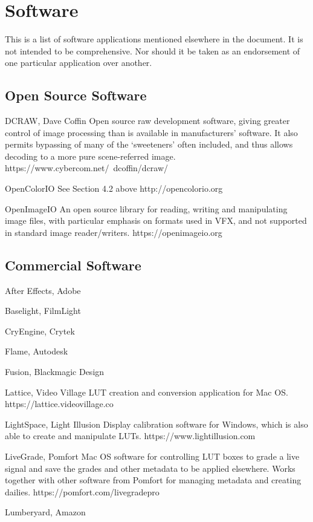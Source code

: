 \section{Software}

This is a list of software applications mentioned elsewhere in the document. It is not intended to be comprehensive. Nor should it be taken as an endorsement of one particular application over another.

\subsection{Open Source Software}

DCRAW, Dave Coffin
Open source raw development software, giving greater control of image processing than is available in manufacturers’ software. It also permits bypassing of many of the ‘sweeteners’ often included, and thus allows decoding to a more pure scene-referred image. https://www.cybercom.net/~dcoffin/dcraw/

OpenColorIO
See Section 4.2 above
http://opencolorio.org

OpenImageIO
An open source library for reading, writing and manipulating image files, with particular emphasis on formats used in VFX, and not supported in standard image reader/writers. https://openimageio.org

\subsection{Commercial Software}
After Effects, Adobe

Baselight, FilmLight

CryEngine, Crytek

Flame, Autodesk

Fusion, Blackmagic Design

Lattice, Video Village
LUT creation and conversion application for Mac OS. https://lattice.videovillage.co

LightSpace, Light Illusion
Display calibration software for Windows, which is also able to create and manipulate LUTs. https://www.lightillusion.com

LiveGrade, Pomfort
Mac OS software for controlling LUT boxes to grade a live signal and save the grades and other metadata to be applied elsewhere. Works together with other software from Pomfort for managing metadata and creating dailies. https://pomfort.com/livegradepro

Lumberyard, Amazon

